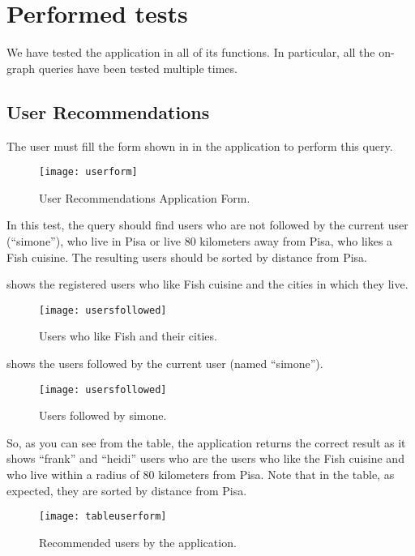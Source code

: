 \chapter{Performed tests}\label{ch:tests}

We have tested the application in all of its functions. In particular, all the
on-graph queries have been tested multiple times.

\section{User Recommendations}

The user must fill the form shown in  in the application to
perform this query.

\begin{figure}[htb]
	\centering
	\texttt{[image: userform]}
	\caption{User Recommendations Application Form.}\label{fig:userform}
\end{figure}

In this test, the query should find users who are not followed by the current
user (``simone''), who live in Pisa or live 80 kilometers away from Pisa, who
likes a Fish cuisine. The resulting users should be sorted by distance from
Pisa.

 shows the registered users who like Fish cuisine and the
cities in which they live.

\begin{figure}[htb]%
	\centering
	\texttt{[image: usersfollowed]}
	\caption{Users who like Fish and their cities.}\label{fig:usersfollowed}
\end{figure}

 shows the users followed by the current user (named
``simone'').

\begin{figure}[htb]%
	\centering
	\texttt{[image: usersfollowed]}
	\caption{Users followed by simone.}\label{fig:usersfollowed}
\end{figure}

So, as you can see from the table, the application returns the correct result as
it shows ``frank'' and ``heidi'' users who are the users who like the Fish
cuisine and who live within a radius of 80 kilometers from Pisa. Note that in
the table, as expected, they are sorted by distance from Pisa.

\begin{figure}[htb]
	\centering
	\texttt{[image: tableuserform]}
	\caption{Recommended users by the application.}\label{fig:tableuserform}
\end{figure}

